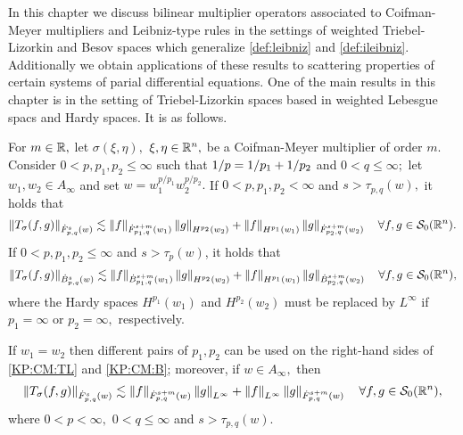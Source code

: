                                                                                                                                                                                                                                                                                                                                                                                                

In this chapter we discuss bilinear multiplier operators associated to Coifman-Meyer multipliers and Leibniz-type rules in the settings of weighted Triebel-Lizorkin and Besov spaces which generalize \ref{def:leibniz} and \ref{def:ileibniz}.  Additionally we obtain applications of these results to scattering properties of certain systems of parial differential equations. One of the main results in this chapter is in the setting of Triebel-Lizorkin spaces based in weighted Lebesgue spacs and Hardy spaces. It is as follows. 

\begin{theorem}\label{thm:CM:TL:B}  For $m \in \re,$ let $\sigma(\xi,\eta),$ $\xi,\eta\in\rn,$ be a Coifman-Meyer multiplier of order $m.$ Consider  $0 < p, p_1, p_2  \le \infty$  such that $\hcline$ and  $0 < q \leq \infty;$ let  $w_1,w_2\in A_\infty$ and set $w=w_1^{{p}/{p_1}} w_2^{{p}/{p_2}}.$ 
If $0 < p,p_1,p_2 < \infty$ and  $s > \tau_{p,q}(w),$  it holds that
\begin{equation}\label{KP:CM:TL}
\norm{T_\sigma(f,g)}{\tlw{p}{s}{q}{w}} \lesssim \norm{f}{\tlw{p_1}{s+m}{q}{w_1} } \norm{g}{H^{p_2}(w_2)} +  \norm{f}{H^{p_1}(w_1)}   \norm{g}{\tlw{p_2}{s+m}{q}{w_2} } \quad \forall f, g \in \swz.
\end{equation}
If $0< p, p_1,p_2\leq \infty$ and $s > \tau_p(w)$, it holds that
\begin{equation}\label{KP:CM:B}
\norm{T_\sigma(f,g)}{\besw{p}{s}{q}{w}} \lesssim \norm{f}{\besw{p_1}{s+m}{q}{w_1} } \norm{g}{H^{p_2}(w_2)} +  \norm{f}{H^{p_1}(w_1)}   \norm{g}{\besw{p_2}{s+m}{q}{w_2} } \quad \forall f, g \in \swz,
\end{equation}
where the Hardy spaces $H^{p_1}(w_1)$ and $H^{p_2}(w_2)$ must be replaced by $L^\infty$ if $p_1=\infty$ or $p_2=\infty,$ respectively.

If $w_1=w_2$ then different pairs of $p_1, p_2$ can be used on the right-hand sides of \eqref{KP:CM:TL} and \eqref{KP:CM:B}; moreover, if $w\in A_\infty,$ then 
\begin{equation}\label{KP:CM:TL2}
\norm{T_\sigma(f,g)}{\tlw{p}{s}{q}{w}} \lesssim \norm{f}{\tlw{p}{s+m}{q}{w} } \norm{g}{L^\infty} +  \norm{f}{L^\infty}   \norm{g}{\tlw{p}{s+m}{q}{w}} \quad \forall f, g \in \swz,
\end{equation}
where $0<p<\infty,$ $0<q\le\infty$ and $s>\tau_{p,q}(w).$
\end{theorem}

